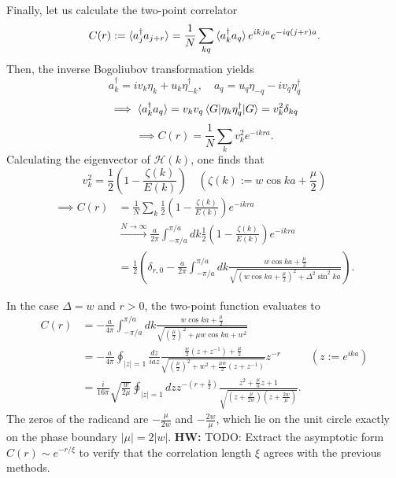 \documentclass{article}
\newcommand{\hwnote}[1]{{\color{red}\textbf{HW:} #1}}
\begin{document}
Finally, let us calculate the two-point correlator
\[
    C(r) := \braket{a_j^\dagger a_{j+r}}
    = \frac{1}{N} \sum_{kq} \braket{a_k^\dagger a_q} e^{ikja} e^{-iq(j+r)a}.
\]
Then, the inverse Bogoliubov transformation yields
\[
    a_k^\dagger = iv_k\eta_k + u_k\eta_{-k}^\dagger,\quad
    a_q = u_q\eta_{-q} - iv_q\eta_q^\dagger
\]
\[
    \implies \braket{a_k^\dagger a_q}
    = v_k v_q \braket{G | \eta_k \eta_q^\dagger | G}
    = v_k^2 \delta_{kq}
\]
\[
    \implies C(r) = \frac{1}{N}\sum_k v_k^2 e^{-ikra}.
\]
Calculating the eigenvector of $\mathcal{H}(k)$, one finds that
\[
    v_k^2 = \frac{1}{2} \left(1 - \frac{\zeta(k)}{E(k)}\right)\quad
    \left(\zeta(k) := w\cos ka + \frac{\mu}{2}\right)
\]
\begin{align*}
    \implies C(r)
    &= \frac{1}{N} \sum_k \frac{1}{2}\left(1 - \frac{\zeta(k)}{E(k)}\right) e^{-ikra} \\
    &\xrightarrow{N\rightarrow\infty} \frac{a}{2\pi}
        \int_{-\pi/a}^{\pi/a} dk \frac{1}{2}\left(1 - \frac{\zeta(k)}{E(k)}\right) e^{-ikra} \\
    &= \frac{1}{2} \left(
        \delta_{r,0} - \frac{a}{2\pi}\int_{-\pi/a}^{\pi/a} dk \frac{w\cos ka + \frac{\mu}{2}}{
            \sqrt{\left(w\cos ka + \frac{\mu}{2}\right)^2 + \Delta^2\sin^2 ka}
        }
    \right).
\end{align*}

In the case $\Delta = w$ and $r > 0$, the two-point function evaluates to
\begin{align*}
    C(r)
    &= -\frac{a}{4\pi}\int_{-\pi/a}^{\pi/a} dk \frac{w\cos ka + \frac{\mu}{2}}{\sqrt{
        \left(\frac{\mu}{2}\right)^2 + \mu w \cos ka + w^2
    }} \\
    &= -\frac{a}{4\pi} \oint_{|z|=1} \frac{dz}{iaz} \frac{\frac{w}{2}\left(z+z^{-1}\right)+\frac{\mu}{2}}{
        \sqrt{\left(\frac{\mu}{2}\right)^2 + w^2 + \frac{\mu w}{2} \left(z+z^{-1}\right)}
    } z^{-r} & (z := e^{ika}) \\
    &= \frac{i}{16\pi}\sqrt{\frac{w}{2\mu}} \oint_{|z|=1} dz z^{-\left(r + \frac{3}{2}\right)}
        \frac{z^2 + \frac{\mu}{w}z + 1}{\sqrt{\left(z+\frac{\mu}{2w}\right)\left(z+\frac{2w}{\mu}\right)}}.
\end{align*}
The zeros of the radicand are $-\frac{\mu}{2w}$ and $-\frac{2w}{\mu}$,
which lie on the unit circle exactly on the phase boundary $|\mu| = 2|w|$.
\hwnote{TODO: Extract the asymptotic form $C(r) \sim e^{-r/\xi}$ to verify that the correlation length $\xi$
agrees with the previous methods.}
\end{document}
